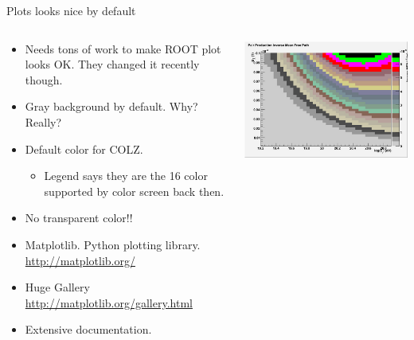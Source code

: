 \documentclass{beamer}
\begin{document}
\begin{frame}[shrink=5]{Plots looks nice by default}
	\begin{columns}
	\begin{column}{0.6\textwidth}
	\begin{itemize}	
	\item Needs tons of work to make
	ROOT plot looks OK. They changed it recently though.
	\item Gray background by default. Why? Really?
	\item Default color for COLZ.
		\begin{itemize}
			\item Legend says they are the 16 color supported 
			by color screen back then.
		\end{itemize}
	\item No transparent color!!

	\item Matplotlib. Python plotting library.
		\url{http://matplotlib.org/}
	\item Huge Gallery 
	\footnotesize{\url{ http://matplotlib.org/gallery.html}}
	\item \normalsize Extensive documentation.
	\end{itemize}
	\end{column}
	\begin{column}{0.4\textwidth}
		\includegraphics[width=\textwidth]{pic/default_palette_400.png}
		

\end{column}
\end{columns}
\end{frame}
\end{document}
